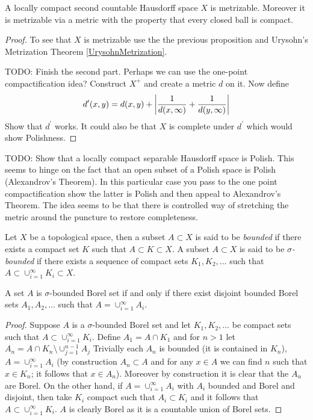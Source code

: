 \begin{cor}\label{LCSCHIsMetrizable}A locally compact second countable Hausdorff space $X$  is metrizable.  Moreover it is metrizable via a metric with the property 
that every closed ball is compact.
\end{cor}
\begin{proof}
To see that $X$ is metrizable use the the previous proposition and Urysohn's Metrization Theorem \ref{UrysohnMetrization}.  

TODO: Finish the second part.  Perhaps we can use the one-point compactification idea?  Construct $X^+$ and create a metric $d$ on it.  Now define 
\begin{align*}
d^\prime(x,y) = d(x,y) + \left \vert \frac{1}{d(x, \infty)} + \frac{1}{d(y,\infty)} \right \vert
\end{align*}
Show that $d^\prime$ works.  It could also be that $X$ is complete under $d^\prime$ which would show Polishness.
\end{proof}

TODO: Show that a locally compact separable Hausdorff space is Polish.  This seems to hinge on the fact that an open subset of a Polish space is Polish (Alexandrov's Theorem).  In this particular case you pass to the one point compactification show the latter is Polish and then appeal to Alexandrov's Theorem.  The idea seems to be that there is controlled way of stretching the metric around the puncture to restore completeness.

\begin{defn}Let $X$ be a topological space, then a subset $A \subset
  X$ is said to be \emph{bounded} if there exists a compact set $K$
  such that 
  $A \subset K \subset X$.  A subset $A \subset
  X$ is said to be \emph{$\sigma$-bounded} if there exists a sequence
  of compact sets $K_1, K_2, \dotsc$ such that
$A \subset  \cup_{i=1}^\infty K_i \subset X$.
\end{defn}

\begin{prop}\label{SigmaBoundedEquivalence}A set $A$ is $\sigma$-bounded Borel set if and only if
  there exist disjoint bounded Borel sets $A_1, A_2, \dotsc$ such that $A =
  \cup_{i=1}^\infty A_i$.
\end{prop}
\begin{proof}
Suppose $A$ is a $\sigma$-bounded Borel set and let $K_1, K_2, \dotsc$
be compact sets such that $A \subset \cup_{i=1}^\infty K_i$.  Define
$A_1= A \cap K_1$ and for $n>1$ let $A_n = A \cap K_n \setminus
\cup_{j=1}^{n-1} A_j$  Trivially each $A_n$ is bounded (it is contained in
$K_n$), $A = \cup_{i=1}^\infty A_i$ (by construction $A_n \subset A$
and for any $x \in A$ we can find $n$ such that $x \in K_n$; it
follows that $x \in A_n$).  Moreover by construction it is clear that
the $A_n$ are Borel.  On the other hand, if $A =
\cup_{i=1}^\infty A_i$ with $A_i$ bounded and Borel and disjoint, then take $K_i$ compact
such that $A_i \subset K_i$ and it follows that $A \subset
\cup_{i=1}^\infty K_i$.  $A$ is clearly Borel as it is a countable
union of Borel sets.
\end{proof}

